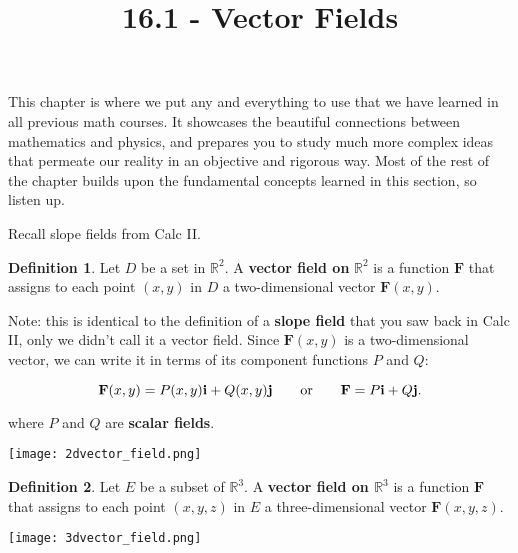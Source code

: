 \documentclass[11pt,oneside,english]{amsart}
\theoremstyle{definition}
\newtheorem*{definition}{Definition}
\newcommand{\ospace}{\hspace{7mm}\text{or}\hspace{7mm}}
\newcommand{\R}{\mathbb{R}}
\begin{document}
\vspace*{-1cm}
\title{16.1 - Vector Fields}
\maketitle

This chapter is where we put any and everything to use that we have learned in all previous math courses. It showcases the beautiful connections between mathematics and physics, and prepares you to study much more complex ideas that permeate our reality in an objective and rigorous way. Most of the rest of the chapter builds upon the fundamental concepts learned in this section, so listen up.

Recall slope fields from Calc II.

\begin{definition}
Let $D$ be a set in $\R^2$. A \textbf{vector field on} $\R^2$ is a function $\mathbf{F}$ that assigns to each point $(x,y)$ in $D$ a two-dimensional vector $\mathbf{F}(x,y)$.

Note: this is identical to the definition of a \textbf{slope field} that you saw back in Calc II, only we didn't call it a vector field. Since $\mathbf{F}(x,y)$ is a two-dimensional vector, we can write it in terms of its component functions $P$ and $Q$:

\[
\mathbf{F}(x,y)=P(x,y)\mathbf{i}+Q(x,y)\mathbf{j}\ospace \mathbf{F}=P\mathbf{i}+Q\mathbf{j}.
\]

where $P$ and $Q$ are \textbf{scalar fields}.
\end{definition}


\begin{center}
\texttt{[image: 2dvector\_field.png]}
\end{center}

\begin{definition}
Let $E$ be a subset of $\R^3$. A \textbf{vector field on $\R^3$} is a function $\mathbf{F}$ that assigns to each point $(x,y,z)$ in $E$ a three-dimensional vector $\mathbf{F}(x,y,z)$.\

\begin{center}
\texttt{[image: 3dvector\_field.png]}
\end{center}

\end{definition}

\pagebreak
\end{document}
